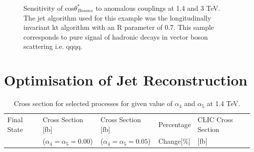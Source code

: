 \begin{figure}
\caption[Sensitivity of $\text{cos}\theta^{8}_{Bosons}$ to the anomalous gauge couplings $\alpha_{4}$ and $\alpha_{5}$ at 1.4 and 3 TeV.]{Sensitivity of $\text{cos}\theta^{*}_{Bosons}$ to anomalous couplings at 1.4 and 3 TeV. The jet algorithm used for this example was the longitudinally invariant kt algorithm with an R parameter of 0.7. This sample corresponds to pure signal of hadronic decays in vector boson scattering i.e. \nu{\nu}qqqq.}
\label{fig:costhetastarbosons}
\end{figure}

\section{Optimisation of Jet Reconstruction}


\begin{table}[h!]
\centering
\begin{tabular}{ l l l l l}
\hline
Final State & Cross Section [fb] & Cross Section [fb] & Percentage & CLIC Cross Section \\ 
& ($\alpha_{4} = \alpha_{5} = 0.00$) & ($\alpha_{4} = \alpha_{5} = 0.05$) & Change[\%] & [fb] \\ 
\hline
\hline
\end{tabular}
\caption{Cross section for selected processes for given value of $\alpha_{4}$ and $\alpha_{5}$ at 1.4 TeV.}
\label{table:optjetalgonumbers}
\end{table}








